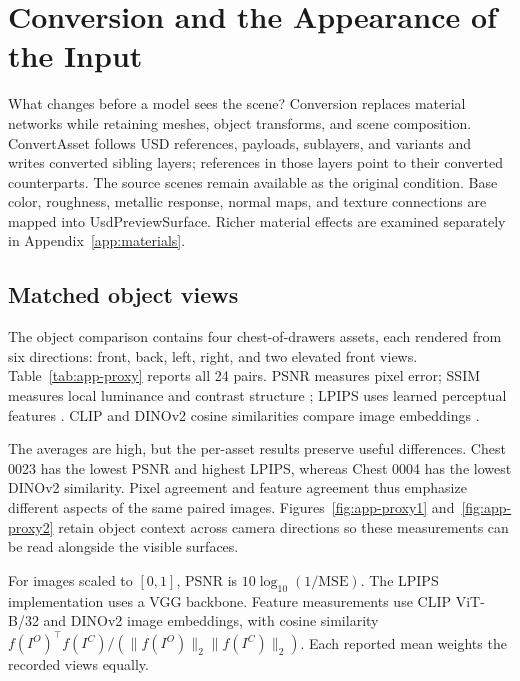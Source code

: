 \section{Conversion and the Appearance of the Input}
\label{app:details}
\label{app:appearance}

What changes before a model sees the scene? Conversion replaces material
networks while retaining meshes, object transforms, and scene composition.
ConvertAsset follows USD references, payloads, sublayers, and variants and
writes converted sibling layers; references in those layers point to their
converted counterparts. The source scenes remain available as the original
condition. Base color, roughness, metallic response, normal maps, and texture
connections are mapped into UsdPreviewSurface. Richer material effects are
examined separately in Appendix~\ref{app:materials}.

\subsection{Matched object views}
The object comparison contains four chest-of-drawers assets, each rendered from
six directions: front, back, left, right, and two elevated front views.
Table~\ref{tab:app-proxy} reports all 24 pairs. PSNR measures pixel error;
SSIM measures local luminance and contrast structure \citep{Wang2004Image};
LPIPS uses learned perceptual features \citep{Zhang2018Unreasonable}.
CLIP and DINOv2 cosine similarities compare image embeddings
\citep{Radford2021Learning,Oquab2023DINOv2}.

\begin{table}[htbp]
\centering\small

\caption{Matched object renders, averaged over six views per asset. PSNR is
in dB; higher PSNR, SSIM, CLIP, and DINOv2 indicate greater similarity, while
lower LPIPS indicates greater similarity.}
\label{tab:app-proxy}
\end{table}

The averages are high, but the per-asset results preserve useful differences.
Chest 0023 has the lowest PSNR and highest LPIPS, whereas Chest 0004 has the
lowest DINOv2 similarity. Pixel agreement and feature agreement thus emphasize
different aspects of the same paired images. Figures~\ref{fig:app-proxy1}
and~\ref{fig:app-proxy2} retain object context across camera directions so these
measurements can be read alongside the visible surfaces.

For images scaled to $[0,1]$, PSNR is $10\log_{10}(1/\mathrm{MSE})$.
The LPIPS implementation uses a VGG backbone. Feature measurements use
CLIP ViT-B/32 and DINOv2 image embeddings, with cosine similarity
$f(I^O)^\top f(I^C)/(\|f(I^O)\|_2\|f(I^C)\|_2)$.
Each reported mean weights the recorded views equally.

